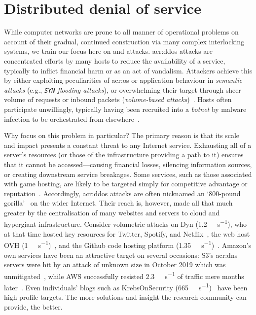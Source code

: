 \section{Distributed denial of service}\label{sec:problems-in-modern-networks}
While computer networks are prone to all manner of operational problems on account of their gradual, continued construction via many complex interlocking systems, we train our focus here on  and  attacks.
\gls{acr:ddos} attacks are concentrated efforts by many hosts to reduce the availability of a service, typically to inflict financial harm or as an act of vandalism.
Attackers achieve this by either exploiting peculiarities of \gls{acr:os} or application behaviour in \emph{semantic attacks} (e.g., \emph{\texttt{SYN} flooding attacks}), or overwhelming their target through sheer volume of requests or inbound packets (\emph{volume-based attacks})~\parencite{DBLP:conf/imc/JonkerKKRSD17}.
Hosts often participate unwillingly, typically having been recruited into a \emph{botnet} by malware infection to be orchestrated from elsewhere~\parencite{DBLP:conf/uss/AntonakakisABBB17}.

Why focus on this problem in particular?
The primary reason is that its scale and impact presents a constant threat to any Internet service.
Exhausting all of a server's resources (or those of the infrastructure providing a path to it) ensures that it cannot be accessed---causing financial losses, silencing information sources, or creating downstream service breakages.
Some services, such as those associated with game hosting, are likely to be targeted simply for competitive advantage or reputation~\parencite{aws-shield-review-2020}.
Accordingly, \gls{acr:ddos} attacks are often nicknamed an `800-pound gorilla'~\parencite{DBLP:conf/imc/CzyzKGPBK14} on the wider Internet.
Their reach is, however, made all that much greater by the centralisation of many websites and servers to cloud and hypergiant infrastructure.
Consider volumetric attacks on Dyn (\qty{1.2}{\tera\bit\per\second}), who at that time hosted key resources for Twitter, Spotify, and Netflix~\parencite{dyn-ddos-2016}, the web host OVH (\qty{1}{\tera\bit\per\second})~\parencite{ovh-ddos-2016}, and the Github code hosting platform (\qty{1.35}{\tera\bit\per\second})~\parencite{github-ddos-2018}.
Amazon's own services have been an attractive target on several occasions: S3's \gls{acr:dns} servers were hit by an attack of unknown size in October 2019 which was unmitigated~\parencite{amazon-s3-2019-ddos}, while AWS successfully resisted \qty{2.3}{\tera\bit\per\second} of traffic mere months later~\parencite{aws-shield-2020-q1}.
Even individuals' blogs such as KrebsOnSecurity (\qty{665}{\giga\bit\per\second})~\parencite{krebs-ddos-2016} have been high-profile targets.
The more solutions and insight the research community can provide, the better.

